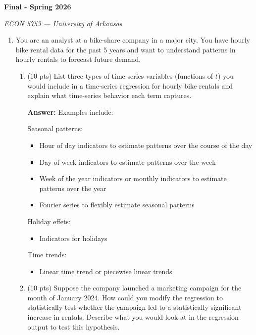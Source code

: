 \documentclass[12pt]{article}
\newcommand{\answer}[1]{{\color{blue_winged_teal}\textbf{Answer:} #1}}
\newcommand{\pts}[1]{{\color{zinc500}(#1 pts)}}
\begin{document}
\begin{center}
  {\Huge\bf Final - Spring 2026}

  \smallskip
  {\large\it ECON 5753 — University of Arkansas}
\end{center}

\vspace{5mm}
\begin{enumerate}
  \item You are an analyst at a bike-share company in a major city. You have hourly bike rental data for the past 5 years and want to understand patterns in hourly rentals to forecast future demand.
    \begin{enumerate}
      \item \pts{10} List three types of time-series variables (functions of $t$) you would include in a time-series regression for hourly bike rentals and explain what time-series behavior each term captures.

      \answer{
        Examples include: 

        Seasonal patterns:
        \begin{itemize}
          \item Hour of day indicators to estimate patterns over the course of the day
          
          \item Day of week indicators to estimate patterns over the week
          
          \item Week of the year indicators or monthly indicators to estimate patterns over the year
          
          \item Fourier series to flexibly estimate seasonal patterns
        \end{itemize}

        Holiday effets:
        \begin{itemize}
          \item Indicators for holidays
        \end{itemize}

        Time trends:
        \begin{itemize}
          \item Linear time trend or piecewise linear trends
        \end{itemize}
      }

      \item \pts{10} Suppose the company launched a marketing campaign for the month of January 2024.
        How could you modify the regression to statistically test whether the campaign led to a statistically significant increase in rentals.
        Describe what you would look at in the regression output to test this hypothesis.


\end{enumerate}
\end{enumerate}
\end{document}
